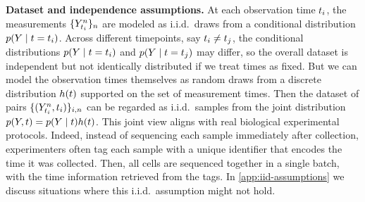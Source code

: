 
\textbf{Dataset and independence assumptions.} 
At each observation time $t_{i}$, the measurements 
$\{\obsat{\timestep{\timeidx}}^{\sampleidx}\}_{\sampleidx}$ are modeled as i.i.d.\ draws from a conditional distribution $p(Y \mid t = t_{i})$. 
Across different timepoints, say $t_{i} \neq t_{j}$, the conditional distributions $p(Y \mid t = t_{i})$ and $p(Y \mid t = t_{j})$ may differ, so the overall dataset is independent but not identically distributed if we treat times as fixed. 
But we can model the observation times themselves as random draws from a discrete distribution $h(t)$ supported on the set of measurement times. 
Then the dataset of pairs $\{(\obsat{\timestep{\timeidx}}^{\sampleidx}, \timestep{\timeidx})\}_{\timeidx,\sampleidx}$ can be regarded as i.i.d.\ samples from the joint distribution $p(Y, t) = p(Y \mid t)h(t)$. 
This joint view aligns with real biological experimental protocols. Indeed, instead of sequencing each sample immediately after collection, experimenters often tag each sample with a unique identifier that encodes the time it was collected. Then, all cells are sequenced together in a single batch, with the time information retrieved from the tags. In \cref{app:iid-assumptions} we discuss situations where this i.i.d.\ assumption might not hold.


